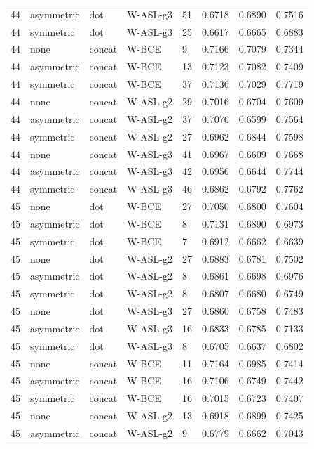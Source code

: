 \begin{longtable}{rllllrrr}
44 & asymmetric & dot & W-ASL-g3 & 51 & 0.6718 & 0.6890 & 0.7516 \\
44 & symmetric & dot & W-ASL-g3 & 25 & 0.6617 & 0.6665 & 0.6883 \\
44 & none & concat & W-BCE & 9 & 0.7166 & 0.7079 & 0.7344 \\
44 & asymmetric & concat & W-BCE & 13 & 0.7123 & 0.7082 & 0.7409 \\
44 & symmetric & concat & W-BCE & 37 & 0.7136 & 0.7029 & 0.7719 \\
44 & none & concat & W-ASL-g2 & 29 & 0.7016 & 0.6704 & 0.7609 \\
44 & asymmetric & concat & W-ASL-g2 & 37 & 0.7076 & 0.6599 & 0.7564 \\
44 & symmetric & concat & W-ASL-g2 & 27 & 0.6962 & 0.6844 & 0.7598 \\
44 & none & concat & W-ASL-g3 & 41 & 0.6967 & 0.6609 & 0.7668 \\
44 & asymmetric & concat & W-ASL-g3 & 42 & 0.6956 & 0.6644 & 0.7744 \\
44 & symmetric & concat & W-ASL-g3 & 46 & 0.6862 & 0.6792 & 0.7762 \\
45 & none & dot & W-BCE & 27 & 0.7050 & 0.6800 & 0.7604 \\
45 & asymmetric & dot & W-BCE & 8 & 0.7131 & 0.6890 & 0.6973 \\
45 & symmetric & dot & W-BCE & 7 & 0.6912 & 0.6662 & 0.6639 \\
45 & none & dot & W-ASL-g2 & 27 & 0.6883 & 0.6781 & 0.7502 \\
45 & asymmetric & dot & W-ASL-g2 & 8 & 0.6861 & 0.6698 & 0.6976 \\
45 & symmetric & dot & W-ASL-g2 & 8 & 0.6807 & 0.6680 & 0.6749 \\
45 & none & dot & W-ASL-g3 & 27 & 0.6860 & 0.6758 & 0.7483 \\
45 & asymmetric & dot & W-ASL-g3 & 16 & 0.6833 & 0.6785 & 0.7133 \\
45 & symmetric & dot & W-ASL-g3 & 8 & 0.6705 & 0.6637 & 0.6802 \\
45 & none & concat & W-BCE & 11 & 0.7164 & 0.6985 & 0.7414 \\
45 & asymmetric & concat & W-BCE & 16 & 0.7106 & 0.6749 & 0.7442 \\
45 & symmetric & concat & W-BCE & 16 & 0.7015 & 0.6723 & 0.7407 \\
45 & none & concat & W-ASL-g2 & 13 & 0.6918 & 0.6899 & 0.7425 \\
45 & asymmetric & concat & W-ASL-g2 & 9 & 0.6779 & 0.6662 & 0.7043 \\

\end{longtable}
